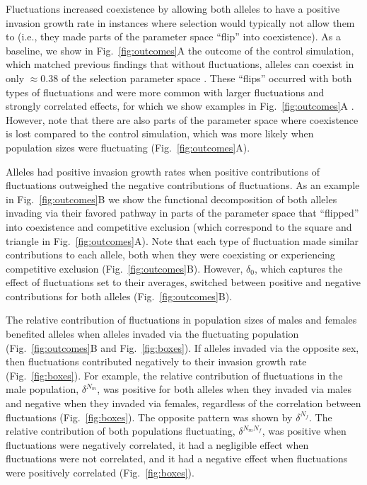 \documentclass[12pt]{article}
\begin{document}
Fluctuations increased coexistence by allowing both alleles to have a positive invasion growth rate in instances where selection would typically not allow them to (i.e., they made parts of the parameter space ``flip'' into coexistence).  As a baseline, we show in Fig.~\ref{fig:outcomes}A the outcome of the control simulation, which matched previous findings that without fluctuations, alleles can coexist in only $\approx 0.38$ of the selection parameter space \citep{connallon2018environmental}. These ``flips'' occurred with both types of fluctuations and were more common with larger fluctuations and strongly correlated effects, for which we show examples in Fig.~\ref{fig:outcomes}A . However, note that there are also parts of the parameter space where coexistence is lost compared to the control simulation, which was more likely when population sizes were fluctuating (Fig.~\ref{fig:outcomes}A).

Alleles had positive invasion growth rates when positive contributions of fluctuations outweighed the negative contributions of fluctuations. As an example in Fig.~\ref{fig:outcomes}B we show the functional decomposition of both alleles invading via their favored pathway in parts of the parameter space that ``flipped'' into coexistence and competitive exclusion (which correspond to the square and triangle in Fig.~\ref{fig:outcomes}A). Note that each type of fluctuation made similar contributions to each allele, both when they were coexisting or experiencing competitive exclusion (Fig.~\ref{fig:outcomes}B). However, $\delta_{0}$, which captures the effect of fluctuations set to their averages, switched between positive and negative contributions for both alleles (Fig.~\ref{fig:outcomes}B).

The relative contribution of fluctuations in population sizes of males and females benefited alleles when alleles invaded via the fluctuating population (Fig.~\ref{fig:outcomes}B and Fig.~\ref{fig:boxes}). If alleles invaded via the opposite sex, then fluctuations contributed negatively to their invasion growth rate  (Fig.~\ref{fig:boxes}). For example, the relative contribution of fluctuations in the male population, $\delta^{N_{m}}$, was positive for both alleles when they invaded via males and negative when they invaded via females, regardless of the correlation between fluctuations (Fig.~\ref{fig:boxes}). The opposite pattern was shown by $\delta^{N_{f}}$. The relative contribution of both populations fluctuating,  $\delta^{N_{m}N_{f}}$, was positive when fluctuations were negatively correlated, it had a negligible effect when fluctuations were not correlated, and it had a negative effect when fluctuations were positively correlated (Fig.~\ref{fig:boxes}).
\end{document}
